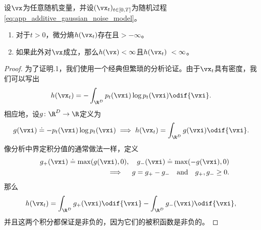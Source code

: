 \documentclass[../../book-main_zh.tex]{subfiles}
\begin{document}
\begin{lemma}\label{lem:diffusion_entropy_exists}
    设\(\vx\)为任意随机变量，并设\((\vx_{t})_{t \in [0, T]}\)为随机过程\eqref{eq:app_additive_gaussian_noise_model}。
    \begin{enumerate}
        \item 对于\(t > 0\)，微分熵\(h(\vx_{t})\)存在且\(> -\infty\)。
        \item 如果此外对\(\vx\)成立，那么\(h(\vx) < \infty\)且\(h(\vx_{t})\ < \infty\)。
    \end{enumerate}
\end{lemma}
\begin{proof}
    为了证明.1，我们使用一个经典但繁琐的分析论证。由于\(\vx_{t}\)具有密度，我们可以写出
    \begin{equation}
        h(\vx_{t}) = -\int_{\R^{D}}p_{t}(\vxi)\log p_{t}(\vxi) \odif{\vxi}.
    \end{equation}
    相应地，设\(g \colon \R^{D} \to \R\)定义为
    \begin{equation}
        g(\vxi) \doteq -p_{t}(\vxi)\log p_{t}(\vxi) \implies
        h(\vx_{t}) = \int_{\R^{D}}g(\vxi)\odif{\vxi}.
    \end{equation}
    像分析中界定积分值的通常做法一样，定义
    \begin{eqnarray}
        &&g_{+}(\vxi) \doteq \max(g(\vxi), 0), \quad g_{-}(\vxi) \doteq
        \max(-g(\vxi), 0) \\ &&\implies \quad g = g_{+} - g_{-}\quad
        \text{and} \quad g_{+}, g_{-} \geq 0.
    \end{eqnarray}
    那么
    \begin{equation}
        h(\vx_{t}) = \int_{\R^{D}}g_{+}(\vxi)\odif{\vxi} -
        \int_{\R^{D}}g_{-}(\vxi)\odif{\vxi},
    \end{equation}
    并且这两个积分都保证是非负的，因为它们的被积函数是非负的。


\end{proof}
\end{document}

